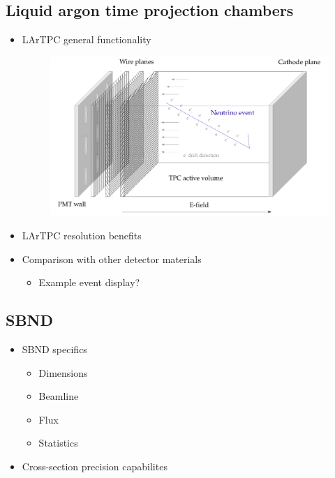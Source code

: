 \subsection{Liquid argon time projection chambers}    

    \begin{itemize}

        \item LArTPC general functionality
        \begin{figure}[h!]
            \center
            \includegraphics[width=\textwidth]{images/LArTPC.pdf}
        \end{figure}

        \item LArTPC resolution benefits
        
        
    
        \item Comparison with other detector materials
        
        \begin{itemize}
            \item Example event display?
        \end{itemize}
    
    \end{itemize}


\subsection{SBND}    

    \begin{itemize}
    
        \item SBND specifics

        \begin{itemize}

            \item Dimensions
            \item Beamline
            \item Flux
            \item Statistics

        \end{itemize}

        \item Cross-section precision capabilites

    \end{itemize}

 \clearpage
